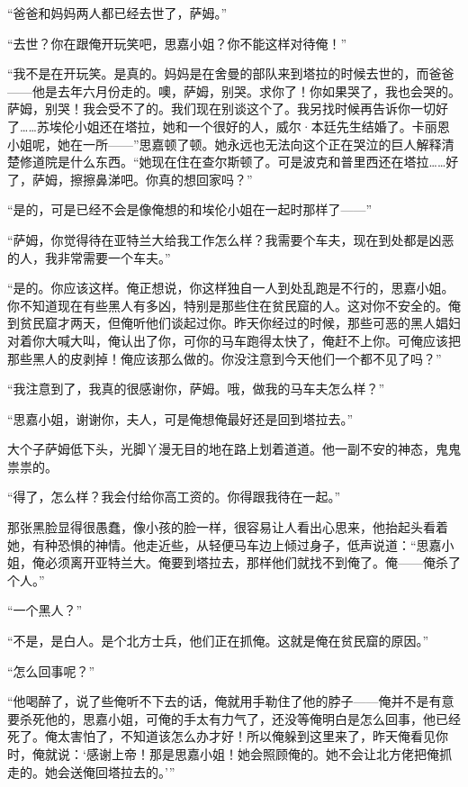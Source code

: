 \par “爸爸和妈妈两人都已经去世了，萨姆。”
\par “去世？你在跟俺开玩笑吧，思嘉小姐？你不能这样对待俺！”
\par “我不是在开玩笑。是真的。妈妈是在舍曼的部队来到塔拉的时候去世的，而爸爸——他是去年六月份走的。噢，萨姆，别哭。求你了！你如果哭了，我也会哭的。萨姆，别哭！我会受不了的。我们现在别谈这个了。我另找时候再告诉你一切好了……苏埃伦小姐还在塔拉，她和一个很好的人，威尔·本廷先生结婚了。卡丽恩小姐呢，她在一所——”思嘉顿了顿。她永远也无法向这个正在哭泣的巨人解释清楚修道院是什么东西。“她现在住在查尔斯顿了。可是波克和普里西还在塔拉……好了，萨姆，擦擦鼻涕吧。你真的想回家吗？”
\par “是的，可是已经不会是像俺想的和埃伦小姐在一起时那样了——”
\par “萨姆，你觉得待在亚特兰大给我工作怎么样？我需要个车夫，现在到处都是凶恶的人，我非常需要一个车夫。”
\par “是的。你应该这样。俺正想说，你这样独自一人到处乱跑是不行的，思嘉小姐。你不知道现在有些黑人有多凶，特别是那些住在贫民窟的人。这对你不安全的。俺到贫民窟才两天，但俺听他们谈起过你。昨天你经过的时候，那些可恶的黑人娼妇对着你大喊大叫，俺认出了你，可你的马车跑得太快了，俺赶不上你。可俺应该把那些黑人的皮剥掉！俺应该那么做的。你没注意到今天他们一个都不见了吗？”
\par “我注意到了，我真的很感谢你，萨姆。哦，做我的马车夫怎么样？”
\par “思嘉小姐，谢谢你，夫人，可是俺想俺最好还是回到塔拉去。”
\par 大个子萨姆低下头，光脚丫漫无目的地在路上划着道道。他一副不安的神态，鬼鬼祟祟的。
\par “得了，怎么样？我会付给你高工资的。你得跟我待在一起。”
\par 那张黑脸显得很愚蠢，像小孩的脸一样，很容易让人看出心思来，他抬起头看着她，有种恐惧的神情。他走近些，从轻便马车边上倾过身子，低声说道：“思嘉小姐，俺必须离开亚特兰大。俺要到塔拉去，那样他们就找不到俺了。俺——俺杀了个人。”
\par “一个黑人？”
\par “不是，是白人。是个北方士兵，他们正在抓俺。这就是俺在贫民窟的原因。”
\par “怎么回事呢？”
\par “他喝醉了，说了些俺听不下去的话，俺就用手勒住了他的脖子——俺并不是有意要杀死他的，思嘉小姐，可俺的手太有力气了，还没等俺明白是怎么回事，他已经死了。俺太害怕了，不知道该怎么办才好！所以俺躲到这里来了，昨天俺看见你时，俺就说：‘感谢上帝！那是思嘉小姐！她会照顾俺的。她不会让北方佬把俺抓走的。她会送俺回塔拉去的。'”
